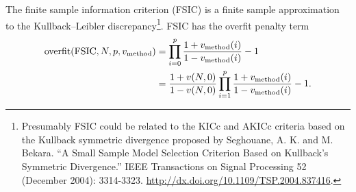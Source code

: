 \documentclass[12pt,letterpaper]{article}
\begin{document}
The finite sample information criterion (FSIC) is a finite sample approximation
to the Kullback--Leibler discrepancy\footnote{ Presumably FSIC could be related
to the KICc and AKICc criteria based on the Kullback symmetric divergence
proposed by Seghouane, A. K. and M. Bekara.  ``A Small Sample Model Selection
Criterion Based on Kullback's Symmetric Divergence.'' IEEE Transactions on
Signal Processing 52 (December 2004): 3314-3323.
\url{http://dx.doi.org/10.1109/TSP.2004.837416}.}. FSIC has the overfit
penalty term
\begin{align}
    \text{overfit}\!\left(\text{FSIC},N,p,v_\text{method}\right)
    &=
    \prod_{i=0}^{p}
    \frac{
        1 + v_\text{method}\!\left(i\right)
    }{
        1 - v_\text{method}\!\left(i\right)
    }
    - 1
    \notag
    \\
    &=
    \frac{
        1 + v\!\left(N,0\right)
    }{
        1 - v\!\left(N,0\right)
    }
    \prod_{i=1}^{p}
    \frac{
        1 + v_\text{method}\!\left(i\right)
    }{
        1 - v_\text{method}\!\left(i\right)
    }
    - 1
    .
\end{align}
\end{document}
